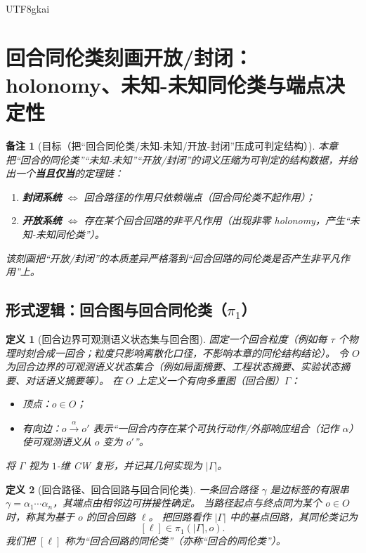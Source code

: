 \documentclass[12pt]{article}
\newtheorem{definition}{定义}[section]
\newtheorem{remark}{备注}[section]
\begin{document}
\begin{CJK*}{UTF8}{gkai}
\section{回合同伦类刻画开放/封闭：holonomy、未知-未知同伦类与端点决定性}
\label{sec:round-homotopy-open-closed}

\begin{remark}[目标（把“回合同伦类/未知-未知/开放-封闭”压成可判定结构）]
本章把“回合的同伦类”“未知-未知”“开放/封闭”的词义压缩为可判定的结构数据，并给出一个\textbf{当且仅当}的定理链：
\begin{enumerate}
  \item \textbf{封闭系统} $\Longleftrightarrow$ 回合路径的作用只依赖端点（回合同伦类不起作用）；
  \item \textbf{开放系统} $\Longleftrightarrow$ 存在某个回合回路的非平凡作用（出现非零 holonomy，产生“未知-未知同伦类”）。
\end{enumerate}
该刻画把“开放/封闭”的本质差异严格落到“回合回路的同伦类是否产生非平凡作用”上。
\end{remark}

\subsection{形式逻辑：回合图与回合同伦类（$\pi_1$）}
\label{sec:round-homotopy-round-graph}

\begin{definition}[回合边界可观测语义状态集与回合图]
\label{def:round-homotopy-round-graph}
固定一个回合粒度（例如每 $\tau$ 个物理时刻合成一回合；粒度只影响离散化口径，不影响本章的同伦结构结论）。
令 $O$ 为回合边界的可观测语义状态集合（例如局面摘要、工程状态摘要、实验状态摘要、对话语义摘要等）。
在 $O$ 上定义一个有向多重图（回合图）$\Gamma$：
\begin{itemize}
  \item 顶点：$o\in O$；
  \item 有向边：$o\xrightarrow{\alpha}o'$ 表示“一回合内存在某个可执行动作/外部响应组合（记作 $\alpha$）使可观测语义从 $o$ 变为 $o'$”。
\end{itemize}
将 $\Gamma$ 视为 $1$-维 CW 复形，并记其几何实现为 $|\Gamma|$。
\end{definition}

\begin{definition}[回合路径、回合回路与回合同伦类]
\label{def:round-homotopy-path-loop}
一条回合路径 $\gamma$ 是边标签的有限串 $\gamma=\alpha_1\cdots\alpha_n$，其端点由相邻边可拼接性确定。
当路径起点与终点同为某个 $o\in O$ 时，称其为基于 $o$ 的回合回路 $\ell$。
把回路看作 $|\Gamma|$ 中的基点回路，其同伦类记为
\[
  [\ell]\in \pi_1(|\Gamma|,o).
\]
我们把 $[\ell]$ 称为“回合回路的同伦类”（亦称“回合的同伦类”）。
\end{definition}


\end{CJK*}
\end{document}
